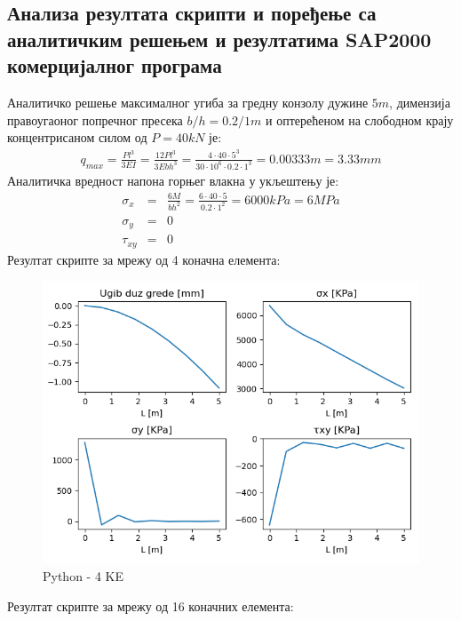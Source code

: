 \documentclass[11pt, a4paper]{article}
\begin{document}
\subsection{Анализа резултата скрипти и поређење са аналитичким решењем и резултатима SAP2000 комерцијалног програма}
Аналитичко решење максималног угиба за гредну конзолу дужине $5m$, димензија правоугаоног попречног пресека $b/h = 0.2/1m$ и оптерећеном на слободном крају концентрисаном силом од $P = 40kN$ је:
\begin{eqnarray*}
q_{max} = \frac{Pl^3}{3EI} = \frac{12Pl^3}{3Ebh^3} = \frac{4 \cdot 40 \cdot 5^3}{30 \cdot 10 ^6 \cdot 0.2 \cdot 1^3} = 0.00333m = 3.33mm
\end{eqnarray*}
Аналитичка вредност напона горњег влакна у укљештењу је:
\begin{eqnarray*}
\sigma_x &=& \frac{6M}{bh^2} = \frac{6 \cdot 40 \cdot 5}{0.2 \cdot 1^2} = 6000 kPa = 6MPa\\
\sigma_y &=& 0 \\
\tau_{xy} &=& 0
\end{eqnarray*}
Резултат скрипте за мрежу од 4 коначна елемента:
\begin{figure}[H]
\includegraphics[width=\textwidth]{Slike/Rezultat_4KE.png}
\caption{Python - 4 KE}
\end{figure}
\newpage
Резултат скрипте за мрежу од 16 коначних елемента:
\end{document}
